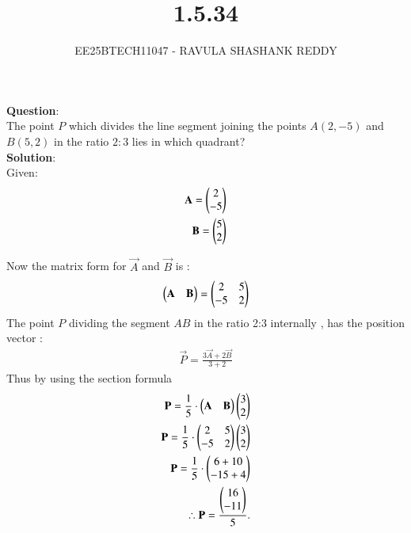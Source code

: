 \documentclass[journal]{article}
\begin{document}
	
	
	\vspace{3cm}
	
\title{1.5.34}
\author{EE25BTECH11047 - RAVULA SHASHANK REDDY}
\maketitle
\hrulefill
\bigskip 

\renewcommand{\thetable}{\theenumi}
\setlength{\intextsep}{10pt}

\textbf{Question}:\\

The point \(P\) which divides the line segment joining the points \(A(2,-5)\) and \(B(5,2)\) in the ratio \(2:3\) lies in which quadrant?\\

\textbf{Solution}:\\

  Given:
\begin{align}
\mathbf{A} = \begin{pmatrix}2 \\ -5\end{pmatrix} \\ \mathbf{B} = \begin{pmatrix}5 \\ 2\end{pmatrix}
\end{align}

Now the matrix form for $\vec{A}$ and $\vec{B}$ is :
\begin{align}
    \begin{pmatrix}\mathbf{A} & \mathbf{B}\end{pmatrix} = \begin{pmatrix}2 & 5 \\ -5 & 2\end{pmatrix}
\end{align}
The point \(P\) dividing the segment \(AB\) in the ratio 2:3 internally , has the position vector :
\begin{align}
\vec{P} = \frac{ 3\vec{A} +2\vec{B} }{3+2} 
\end{align}
Thus by using the section formula \\
\begin{align} 
\mathbf{P}= \frac{1}{5} \cdot \begin{pmatrix}\mathbf{A} & \mathbf{B}\end{pmatrix}\begin{pmatrix}3 \\ 2\end{pmatrix}\\
\mathbf{P}= \frac{1}{5} \cdot \begin{pmatrix}2 & 5 \\ -5 & 2\end{pmatrix}\begin{pmatrix}3 \\ 2\end{pmatrix}\\
\mathbf{P}= \frac{1}{5} \cdot \begin{pmatrix}6 + 10\\ -15 + 4\end{pmatrix}\\
\therefore \mathbf{P}= \frac{\begin{pmatrix}16 \\ -11\end{pmatrix}}{5}.
\end{align}
\end{document}

